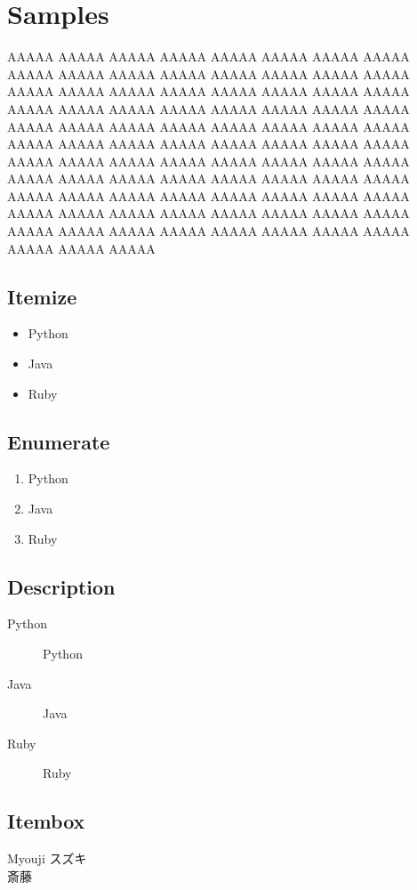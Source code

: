 \section{Samples} \label{section:samples}

AAAAA AAAAA AAAAA AAAAA AAAAA AAAAA AAAAA AAAAA AAAAA AAAAA AAAAA AAAAA AAAAA
AAAAA AAAAA AAAAA AAAAA AAAAA AAAAA AAAAA AAAAA AAAAA AAAAA AAAAA AAAAA AAAAA
AAAAA AAAAA AAAAA AAAAA AAAAA AAAAA AAAAA AAAAA AAAAA AAAAA AAAAA AAAAA AAAAA
AAAAA AAAAA AAAAA AAAAA AAAAA AAAAA AAAAA AAAAA AAAAA AAAAA AAAAA AAAAA AAAAA
AAAAA AAAAA AAAAA AAAAA AAAAA AAAAA AAAAA AAAAA AAAAA AAAAA AAAAA AAAAA AAAAA
AAAAA AAAAA AAAAA AAAAA AAAAA AAAAA AAAAA AAAAA AAAAA AAAAA AAAAA AAAAA AAAAA
AAAAA AAAAA AAAAA AAAAA AAAAA AAAAA AAAAA AAAAA AAAAA AAAAA AAAAA AAAAA AAAAA

\subsection{Itemize}
\begin{itemize}
  \item Python
  \item Java
  \item Ruby
\end{itemize}

\subsection{Enumerate}
\begin{enumerate}
  \item Python
  \item Java
  \item Ruby
\end{enumerate}

\subsection{Description}
\begin{description}
  \item[Python] Python
  \item[Java]   Java
  \item[Ruby]   Ruby
\end{description}

\subsection{Itembox}
\begin{itembox}[l]{Myouji}
  スズキ\\
  斎藤
\end{itembox}

